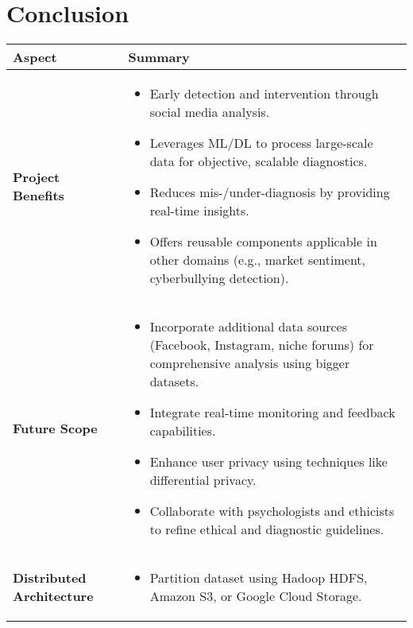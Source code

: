 
\section{Conclusion}

\begin{table}[H]
    \label{tab:project_summary}
    \begin{tabularx}{\textwidth}{|>{\raggedright\arraybackslash}p{3cm}|X|}
    \hline
    \textbf{Aspect} & \textbf{Summary} \\ \hline
    \textbf{Project Benefits} & 
    \begin{itemize}[noitemsep, leftmargin=*, topsep=0pt]
        \item Early detection and intervention through social media analysis.
        \item Leverages ML/DL to process large-scale data for objective, scalable diagnostics.
        \item Reduces mis-/under-diagnosis by providing real-time insights.
        \item Offers reusable components applicable in other domains (e.g., market sentiment, cyberbullying detection).
    \end{itemize} \\ \hline
    \textbf{Future Scope} & 
    \begin{itemize}[noitemsep, leftmargin=*, topsep=0pt]
        \item Incorporate additional data sources (Facebook, Instagram, niche forums) for comprehensive analysis using bigger datasets.
        \item Integrate real-time monitoring and feedback capabilities.
        \item Enhance user privacy using techniques like differential privacy.
        \item Collaborate with psychologists and ethicists to refine ethical and diagnostic guidelines.
    \end{itemize} \\ \hline
    \textbf{Distributed Architecture} & 
    \begin{itemize}[noitemsep, leftmargin=*, topsep=0pt]
        \item Partition dataset using Hadoop HDFS, Amazon S3, or Google Cloud Storage.

\end{itemize}
\end{tabularx}
\end{table}
